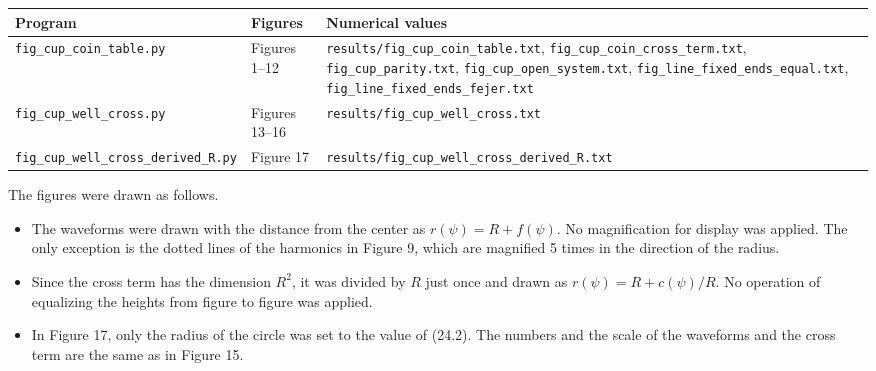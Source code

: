 \documentclass[
  a4paper,
]{article}
\newcounter{none} %
\providecommand{\tightlist}{%
  \setlength{\itemsep}{0pt}\setlength{\parskip}{0pt}}
\begin{document}
{\def\LTcaptype{none} %
\begin{longtable}[]{@{}
  >{\raggedright\arraybackslash}p{}
  >{\raggedright\arraybackslash}p{}
  >{\raggedright\arraybackslash}p{}@{}}
\toprule\noalign{}
\begin{minipage}[b]{\linewidth}\raggedright
Program
\end{minipage} & \begin{minipage}[b]{\linewidth}\raggedright
Figures
\end{minipage} & \begin{minipage}[b]{\linewidth}\raggedright
Numerical values
\end{minipage} \\
\midrule\noalign{}
\endhead
\bottomrule\noalign{}
\endlastfoot
\texttt{fig\_\allowbreak{}cup\_\allowbreak{}coin\_\allowbreak{}table.py} & Figures 1--12 &
\texttt{results/\allowbreak{}fig\_\allowbreak{}cup\_\allowbreak{}coin\_\allowbreak{}table.txt},
\texttt{fig\_\allowbreak{}cup\_\allowbreak{}coin\_\allowbreak{}cross\_\allowbreak{}term.txt}, \texttt{fig\_\allowbreak{}cup\_\allowbreak{}parity.txt},
\texttt{fig\_\allowbreak{}cup\_\allowbreak{}open\_\allowbreak{}system.txt},
\texttt{fig\_\allowbreak{}line\_\allowbreak{}fixed\_\allowbreak{}ends\_\allowbreak{}equal.txt},
\texttt{fig\_\allowbreak{}line\_\allowbreak{}fixed\_\allowbreak{}ends\_\allowbreak{}fejer.txt} \\
\texttt{fig\_\allowbreak{}cup\_\allowbreak{}well\_\allowbreak{}cross.py} & Figures 13--16 &
\texttt{results/\allowbreak{}fig\_\allowbreak{}cup\_\allowbreak{}well\_\allowbreak{}cross.txt} \\
\texttt{fig\_\allowbreak{}cup\_\allowbreak{}well\_\allowbreak{}cross\_\allowbreak{}derived\_\allowbreak{}R.py} & Figure 17 &
\texttt{results/\allowbreak{}fig\_\allowbreak{}cup\_\allowbreak{}well\_\allowbreak{}cross\_\allowbreak{}derived\_\allowbreak{}R.txt} \\
\end{longtable}
}

The figures were drawn as follows.

\begin{itemize}
\tightlist
\item
  The waveforms were drawn with the distance from the center as
  \(r(\psi)=R+f(\psi)\). No magnification for display was applied. The
  only exception is the dotted lines of the harmonics in Figure 9, which
  are magnified 5 times in the direction of the radius.
\item
  Since the cross term has the dimension \(R^2\), it was divided by
  \(R\) just once and drawn as \(r(\psi)=R+c(\psi)/R\). No operation of
  equalizing the heights from figure to figure was applied.
\item
  In Figure 17, only the radius of the circle was set to the value of
  (24.2). The numbers and the scale of the waveforms and the cross term
  are the same as in Figure 15.
\end{itemize}
\end{document}
